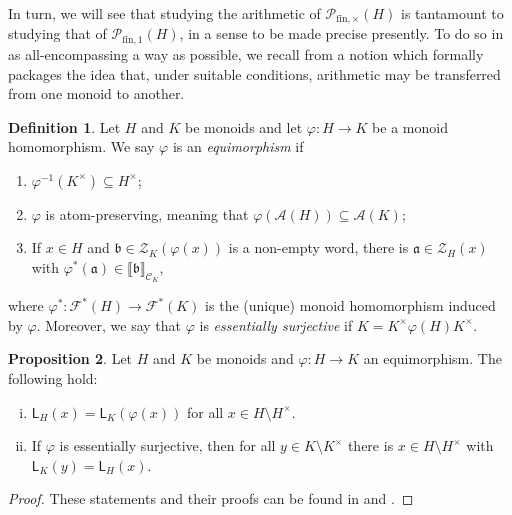 \documentclass{report}
\renewcommand{\P}{\mathcal{P}}
\newcommand{\llb}{\llbracket}
\newcommand{\rrb}{\rrbracket}
\newcommand{\funt}{{\textrm{fin}, \times}}
\newcommand{\fun}{{\textrm{fin}, 1}}
\renewcommand{\:}{\text{:}}
\theoremstyle{definition}
\newtheorem{defn}{Definition}[section]
\newtheorem{prop}[defn]{Proposition}
\begin{document}
In turn, we will see that studying the arithmetic of $\P_\funt(H)$ is tantamount to studying that of $\P_\fun(H)$, in a sense to be made precise presently.
To do so in as all-encompassing a way as possible, we recall from \cite[Definition 3.2]{tringali18} a notion which formally packages the idea that, under suitable conditions, arithmetic may be transferred from one monoid to another.
%
\begin{defn}\label{def:equimorphism}
Let $H$ and $K$ be monoids and let $\varphi: H\to K$ be a monoid homomorphism.
We say $\varphi$ is an \textit{equimorphism} if
\begin{enumerate}[(\small{E}1)]
\item\label{def:equimorphism(E1)} $\varphi^{-1}(K^\times)\subseteq H^\times$;
\item\label{def:equimorphism(E2)} $\varphi$ is atom-preserving, meaning that $\varphi(\mathscr{A}(H)) \subseteq \mathscr{A}(K)$;
\item\label{def:equimorphism(E3)} If $x\in H$ and $\mathfrak{b}\in \mathcal{Z}_K(\varphi(x))$ is a non-empty word, there is $\mathfrak{a}\in \mathcal{Z}_H(x)$ with $\varphi^*(\mathfrak{a}) \in \llb \mathfrak{b} \rrb_{\mathscr{C}_K}$,
\end{enumerate}
where $\varphi^*: \mathscr{F}^*(H)\to\mathscr{F}^*(K)$ is the (unique) monoid homomorphism induced by $\varphi$.
Moreover, we say that $\varphi$ is \textit{essentially surjective} if $K = K^\times \varphi(H)K^\times$.
\end{defn}
%
\begin{prop}\label{prop:equimorphism}
Let $H$ and $K$ be monoids and $\varphi:H\to K$ an equimorphism. The following hold:
\begin{enumerate}[(i)]%
\item\label{prop:equimorphism(i)} $\mathsf{L}_H(x) = \mathsf{L}_K(\varphi(x))$ for all $x\in H\setminus H^\times$.
\item\label{prop:equimorphism(ii)} If $\varphi$ is essentially surjective, then for all $y\in K\setminus K^\times$ there is $x\in H\setminus H^\times$ with $\mathsf{L}_K(y) = \mathsf{L}_H(x)$.
\end{enumerate}
\end{prop}
%
\begin{proof}
	These statements and their proofs can be found in \cite[Theorem 2.22]{fan-tringali18} and \cite[Theorem 3.3]{tringali18}.
\end{proof}
%
\end{document}
